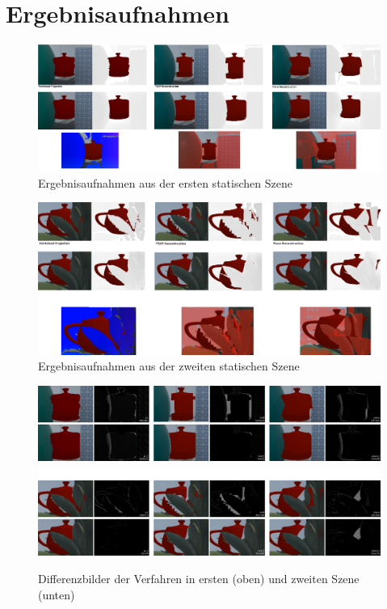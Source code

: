 \chapter{Ergebnisaufnahmen}
\begin{figure}
  \centering
	\includegraphics[width=1.0\textwidth]{content/images/evaluation/static_occlusion.png} 
  \caption{Ergebnisaufnahmen aus der ersten statischen Szene}
  \label{fig:static_occlusion}
\end{figure}

\begin{figure}
  \centering
	\includegraphics[width=1.0\textwidth]{content/images/evaluation/plant_occlusion.png} 
  \caption{Ergebnisaufnahmen aus der zweiten statischen Szene}
  \label{fig:plant_occlusion}
\end{figure}

\begin{figure}
  \centering
	\includegraphics[width=1.0\textwidth]{content/images/evaluation/static_occlusion_results.png} 
	\includegraphics[width=1.0\textwidth]{content/images/evaluation/spacer.png} 
	\includegraphics[width=1.0\textwidth]{content/images/evaluation/plant_occlusion_results.png} 
  \caption{Differenzbilder der Verfahren in ersten (oben) und zweiten Szene (unten)}
  \label{fig:static_occlusion_results}
\end{figure}
